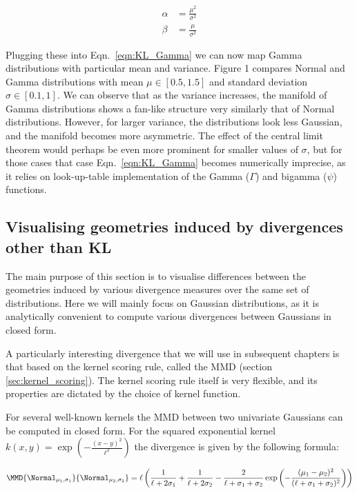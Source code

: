\begin{align}
	\alpha &= \frac{\mu^2}{\sigma^2}\\
	\beta &= \frac{\mu}{\sigma^2}
\end{align}

Plugging these into Eqn.\ \eqref{eqn:KL_Gamma} we can now map Gamma distributions with particular mean and variance. Figure 1 compares Normal and Gamma distributions with mean $\mu\in[0.5,1.5]$ and standard deviation $\sigma\in[0.1,1]$. We can observe that as the variance increases, the manifold of Gamma distributions shows a fan-like structure very similarly that of Normal distributions. However, for larger variance, the distributions look less Gaussian, and the manifold becomes more asymmetric. The effect of the central limit theorem would perhaps be even more prominent for smaller values of $\sigma$, but for those cases that case Eqn.\ \eqref{eqn:KL_Gamma} becomes numerically imprecise, as it relies on look-up-table implementation of the Gamma ($\Gamma$) and bigamma ($\psi$) functions.

\subsection{Visualising geometries induced by divergences other than KL}

The main purpose of this section is to visualise differences between the geometries induced by various divergence measures over the same set of distributions. Here we will mainly focus on Gaussian distributions, as it is analytically convenient to compute various divergences between Gaussians in closed form.

A particularly interesting divergence that we will use in subsequent chapters is that based on the kernel scoring rule, called the MMD (section \ref{sec:kernel_scoring}). The kernel scoring rule itself is very flexible, and its properties are dictated by the choice of kernel function.

For several well-known kernels the MMD between two univariate Gaussians can be computed in closed form. For the squared exponential kernel $k(x,y)=\exp(-\frac{(x-y)^2}{\ell^2})$ the divergence is given by the following formula:

\begin{equation}
	\MMD{\Normal_{\mu_1,\sigma_1}}{\Normal_{\mu_2,\sigma_2}} = \ell\left(\frac{1}{\ell+2\sigma_1} + \frac{1}{\ell+2\sigma_2} - \frac{2}{\ell+\sigma_1 + \sigma_2}\exp\left(-\frac{(\mu_1 - \mu_2)^2}{(\ell + \sigma_1 + \sigma_2)^2}\right)\right)
\end{equation}

